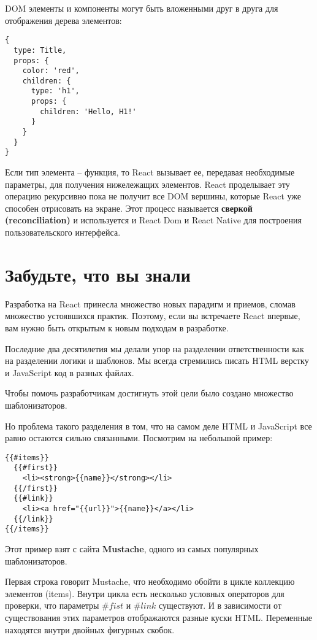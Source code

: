 DOM элементы и компоненты могут быть вложенными друг в друга для отображения дерева элементов:

\begin{lstlisting}
{
  type: Title,
  props: {
    color: 'red',
    children: {
      type: 'h1',
      props: {
        children: 'Hello, H1!'
      }
    } 
  }
}
\end{lstlisting}

Если тип элемента -- функция, то React вызывает ее, передавая необходимые параметры, для получения нижележащих элементов. React проделывает эту операцию рекурсивно пока не получит все DOM вершины, которые React уже способен отрисовать на экране. Этот процесс называется \textbf{сверкой (reconciliation)} и используется и React Dom и React Native для построения пользовательского интерфейса.


\section{Забудьте, что вы знали}	

Разработка на React принесла множество новых парадигм и приемов, сломав множество устоявшихся практик. Поэтому, если вы встречаете React впервые, вам нужно быть открытым к новым подходам в разработке.

Последние два десятилетия мы делали упор на разделении ответственности как на разделении логики и шаблонов. Мы всегда стремились писать HTML верстку и JavaScript код в разных файлах. 

Чтобы помочь разработчикам достигнуть этой цели было создано множество шаблонизаторов. 

Но проблема такого разделения в том, что на самом деле HTML и JavaScript все равно остаются сильно связанными. Посмотрим на небольшой пример:

\begin{lstlisting}
{{#items}}
  {{#first}}
    <li><strong>{{name}}</strong></li>
  {{/first}}
  {{#link}}
    <li><a href="{{url}}">{{name}}</a></li>
  {{/link}}
{{/items}}
\end{lstlisting}

Этот пример взят с сайта \textbf{Mustache}, одного из самых популярных шаблонизаторов.

Первая строка говорит Mustache, что необходимо обойти в цикле коллекцию элементов (items). Внутри цикла есть несколько условных операторов для проверки, что параметры $\#fist$ и $\#link$ существуют. И в зависимости от существования этих параметров отображаются разные куски HTML. Переменные находятся внутри двойных фигурных скобок.

